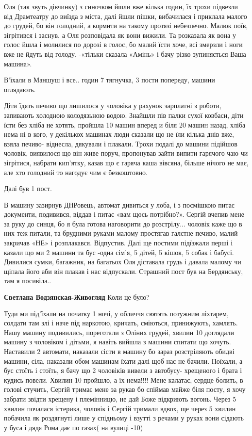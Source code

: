 \begin{itemize}
Оля (так звуть дівчинку) з синочком йшли вже кілька годин, їх трохи підвезли
від Драмтеатру до виїзда з міста, далі йшли пішки, вибачилася і приклала малого
до грудей, бо він голодний, а кормити на такому протязі небезпечно. Малюк поїв,
зігрітився і заснув, а Оля розповідала як вони вижили. Та розказала як вона у
голос йшла і молилися по дорозі в голос, бо малий їсти хоче, всі змерзли і ноги
вже не йдуть від голоду. -«тільки сказала «Амінь» і бачу різко зупиняється Ваша
машина».


В'їхали в Маншуш і все.. годин 7 тягнучка, 3 пости попереду, машини оглядають.

Діти їдять печиво що лишилося у чоловіка у рахунок зарплатні з роботи,
запивають холодною колодязьною водою. Знайшли пів палки сухої ковбаси, діти
їсти без хліба не хотять, пройшла 10 машин вперед и біля 20 машин назад, хліба
нема ні в кого, у декількох машинах люди сказали що не їли кілька днів вже,
взяла печиво- віднесла, дякували і плакали. Трохи подалі до машини підійшов
чоловік, виявилося що він живе поруч, пропонував зайти випити гарячого чаю чи
зігрітися, набрати кип'ятку, казав що є гаряча каша вівсяна, більше нічого не
має, але хто голодний то нагодує чим є безкоштовно.

Далі був 1 пост.

В машину зазирнув ДНРовець, автомат дивиться у лоба, і з посмішкою питає
документи, подивився, віддав і питає «вам щось потрібно?». Сергій вчепив мене
за руку до синця, бо я була готова наговорити до розстрілу... чоловік каже що в
них теж питали, та брудними руками малому простягав галєтне печиво, малий
закричав «НЕ» і розплакався. Відпустив. Далі ще постими підїзжали перші і
казали що ми 2 машини та бус -одна сім'я, 5 дітей, 5 кішок, 5 собак і бабусі.
Дивилися сумки, багажник, на багатьох Оля діставала грудь і давала малому чи
щіпала його аби він плакав і нас відпускали. Страшний пост був на Бердянську,
там я посивіла..

\textbf{Светлана Водзянская-Живогляд} Коли це було?


Туди ми під'їхали на початку 1 ночі, у обличчя святять потужним ліхтарем,
солдати там злі і наче під наркотою, кричать, сміються, принижують, хамлять.
Нашу машину подивились, пореготали з Оліних грудей, хвилин 10 доглядали машину
з чоловіком і дітьми, я навіть вийшла з машини спитати що хочуть. Наставили 2
автомати, наказали сісти в машину бо зараз розстріляють обидві машини, сіла,
наказали обом машинам їхати далі щоб нас не бачили. Поїхали, а бус стоїть і
стоїть, я бачу що 2 чоловіків вивели з автобусу- хрещеного і брата і кудись
повели. Хвилин 10 пройшло, а їх нема!!!! Мене калатає, сердце болить, в голові
стучить, Сергій тримає мене за рукав бо спіймав майже біля посту, я хочу
забрати звідти хрещену і племінницю, не дай Боже відкриють вогонь. Через 5
хвилин почалася істерика, чоловік і Сергій тримали вдвох, ще через 5 хвилин
побачила як роздягнуті лише у спідньому і взутті з речами у руках вони сідають
у буса і дядя Рома дає по газах( на вулиці -10)


\end{itemize}
